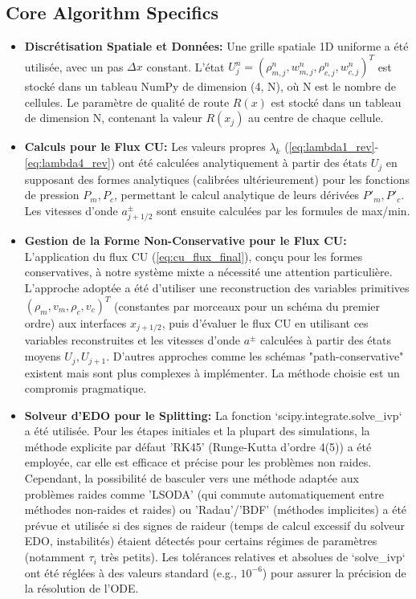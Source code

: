 \subsection{Core Algorithm Specifics}
\label{subsec:algo_specifics}

\begin{itemize}
    \item \textbf{Discrétisation Spatiale et Données:} Une grille spatiale 1D uniforme a été utilisée, avec un pas \( \Delta x \) constant. L'état \( U_j^n = (\rho_{m,j}^n, w_{m,j}^n, \rho_{c,j}^n, w_{c,j}^n)^T \) est stocké dans un tableau NumPy de dimension (4, N), où N est le nombre de cellules. Le paramètre de qualité de route \( R(x) \) est stocké dans un tableau de dimension N, contenant la valeur \( R(x_j) \) au centre de chaque cellule.
    \item \textbf{Calculs pour le Flux CU:} Les valeurs propres \( \lambda_k \) (\ref{eq:lambda1_rev}-\ref{eq:lambda4_rev}) ont été calculées analytiquement à partir des états \( U_j \) en supposant des formes analytiques (calibrées ultérieurement) pour les fonctions de pression \( P_m, P_c \), permettant le calcul analytique de leurs dérivées \( P'_m, P'_c \). Les vitesses d'onde \( a_{j+1/2}^\pm \) sont ensuite calculées par les formules de max/min.
    \item \textbf{Gestion de la Forme Non-Conservative pour le Flux CU:} L'application du flux CU (\ref{eq:cu_flux_final}), conçu pour les formes conservatives, à notre système mixte a nécessité une attention particulière. L'approche adoptée a été d'utiliser une reconstruction des variables primitives \( (\rho_m, v_m, \rho_c, v_c)^T \) (constantes par morceaux pour un schéma du premier ordre) aux interfaces \( x_{j+1/2} \), puis d'évaluer le flux CU en utilisant ces variables reconstruites et les vitesses d'onde \( a^\pm \) calculées à partir des états moyens \( U_j, U_{j+1} \). D'autres approches comme les schémas "path-conservative" \cite{Pares2006PathConservative} existent mais sont plus complexes à implémenter. La méthode choisie est un compromis pragmatique.
    \item \textbf{Solveur d'EDO pour le Splitting:} La fonction `scipy.integrate.solve\_ivp` a été utilisée. Pour les étapes initiales et la plupart des simulations, la méthode explicite par défaut 'RK45' (Runge-Kutta d'ordre 4(5)) a été employée, car elle est efficace et précise pour les problèmes non raides. Cependant, la possibilité de basculer vers une méthode adaptée aux problèmes raides comme 'LSODA' (qui commute automatiquement entre méthodes non-raides et raides) ou 'Radau'/'BDF' (méthodes implicites) a été prévue et utilisée si des signes de raideur (temps de calcul excessif du solveur EDO, instabilités) étaient détectés pour certains régimes de paramètres (notamment \(\tau_i\) très petits). Les tolérances relatives et absolues de `solve\_ivp` ont été réglées à des valeurs standard (e.g., \(10^{-6}\)) pour assurer la précision de la résolution de l'ODE.

\end{itemize}
